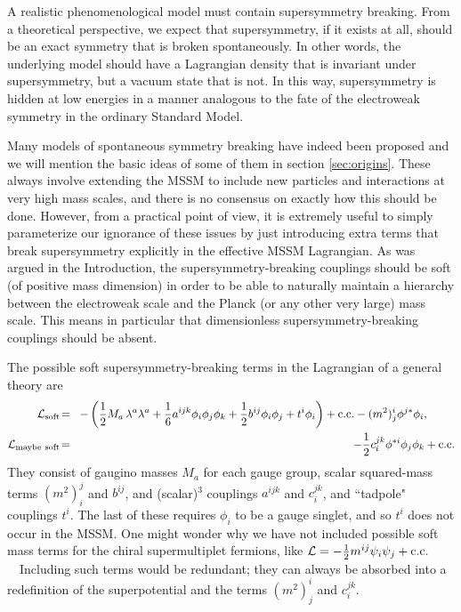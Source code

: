 \documentclass[11pt]{article}
\def\beq{\begin{eqnarray}}
\def\eeq{\end{eqnarray}}
\def\lagr{{\cal L}}
\def\conj{{{\rm c.c.}}}
\def\half{{1\over 2}}
\begin{document}
A realistic phenomenological model must contain supersymmetry breaking.
From a theoretical perspective, we expect that supersymmetry, if it exists
at all, should be an exact symmetry that is broken spontaneously. In other
words, the underlying model should have a Lagrangian density that is
invariant under supersymmetry, but a vacuum state that is not. In this
way, supersymmetry is hidden at low energies in a manner analogous
to the fate of the electroweak symmetry in the ordinary Standard Model. 

Many models of spontaneous symmetry breaking have indeed been proposed and
we will mention the basic ideas of some of them in section
\ref{sec:origins}. These always involve extending the MSSM to include new
particles and interactions at very high mass scales, and there is no
consensus on exactly how this should be done. However, from a practical
point of view, it is extremely useful to simply parameterize our ignorance
of these issues by just introducing extra terms that break supersymmetry
explicitly in the effective MSSM Lagrangian. As was argued in the
Introduction, the supersymmetry-breaking couplings should be soft (of
positive mass dimension) in order to be able to naturally maintain a
hierarchy between the electroweak scale and the Planck (or any other very
large) mass scale. This means in particular that dimensionless 
supersymmetry-breaking couplings should be absent.

The possible soft supersymmetry-breaking terms in the Lagrangian of a
general theory are
\beq
\lagr_{\rm soft}\! &=& \!
-\left (
\half M_a\, \lambda^a\lambda^a 
+ {1\over 6}a^{ijk} \phi_i\phi_j\phi_k 
+ \half b^{ij} \phi_i\phi_j 
+ t^i \phi_i \right )
+ \conj 
- (m^2)_j^i \phi^{j*} \phi_i , \phantom{xxxx}
\label{lagrsoft}
\\
\lagr_{{\rm maybe}\>\,{\rm soft}}\! &=& \!
-{1\over 2}c_i^{jk} \phi^{*i}\phi_j\phi_k + \conj
\label{lagrsoftprime}
\eeq
They consist of gaugino masses $M_a$ for each gauge group, scalar
squared-mass terms $(m^2)_i^j$ and $b^{ij}$, and (scalar)$^3$ couplings
$a^{ijk}$ and $c_i^{jk}$, and ``tadpole" couplings $t^i$. The last of
these requires $\phi_i$ to be a gauge singlet, and so $t^i$ does not occur 
in the MSSM. One might wonder why we have not included possible soft mass
terms for the chiral supermultiplet fermions, like ${\cal L} = -\half
m^{ij} \psi_i \psi_j + {\rm c.c.}$~~Including such terms would be
redundant; they can always be absorbed into a redefinition of the
superpotential and the terms $(m^2)_j^{i}$ and $c_i^{jk}$. 
\end{document}
